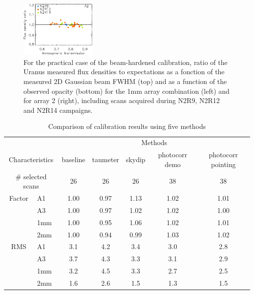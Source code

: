 \begin{figure}[ht!]
\begin{center}
    \includegraphics[clip=true, width=0.3337\textwidth]{Figures/Calibration/plot_flux_density_ratio_obstau_uranus_corrected_skydip_photocorr_pointing_narrow_a2.pdf}

  
\caption[Uranus flux density stability using the
  practical case of the beam-hardened calibration]{For the
  practical case of the beam-hardened calibration, 
  ratio of the Uranus measured flux densities to expectations as a
  fonction of the measured 2D Gaussian beam FWHM (top) and as a
  function of the observed opacity (bottom) for the 1mm array
  combination (left) and for array 2 (right),
  including scans acquired during N2R9, N2R12 and N2R14 campaigns. }
\label{fig:calib_uranus_vs_atmtrans_all}
\end{center}
\end{figure}



\begin{table}[th]
\begin{center}
\begin{tabular}{|c|l|c|c|c|c|c|}
  \hline
  \multicolumn{2}{|c|}{}  &  \multicolumn{5}{|c|}{Methods} \\\cline{3-7}
  \multicolumn{2}{|c|}{Characteristics} &  baseline  & taumeter  &  skydip  &  photocorr demo & photocorr pointing \\
  \hline\hline
   \multicolumn{2}{|c|}{$\#$ selected scans} & 26    &       26  &    26    &    38           &    38 \\ 
  \hline 
  Factor &  A1          &   1.00  &  0.97   &  1.13    &   1.02    &   1.01  \\
       &  A3            &   1.00  &  0.97   &  1.02    &   1.02    &   1.00  \\
       &  1mm           &   1.00  &  0.95   &  1.06    &   1.02    &   1.01  \\
       &  2mm           &   1.00  &  0.94   &  0.99    &   1.03    &   1.02  \\
  \hline
  RMS  &  A1            &  3.1    &   4.2   &   3.4    &    3.0    &   2.8 \\
       &  A3            &  3.7    &   4.3   &   3.3    &    3.1    &   2.9 \\
       &  1mm           &  3.2    &   4.5   &   3.3    &    2.7    &   2.5 \\
       &  2mm           &  1.6    &   2.6   &   1.5    &    1.3    &   1.5 \\
\hline\hline
\end{tabular}
\caption[Comparison of calibration results using five methods]{Comparison of calibration results using five methods}
\label{tab:Calibration_results_all}
\end{center}
\end{table}





